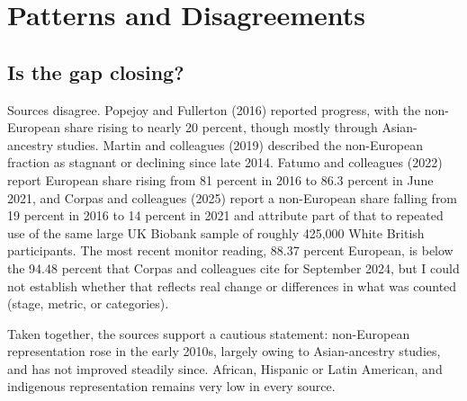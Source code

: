 \documentclass[12pt]{article}
\begin{document}
\begin{table}[H]
\centering\small
\caption{Quantified differences reported in three analyses of how ancestry imbalance relates to tool performance or study composition.}
\end{table}

\section*{Patterns and Disagreements}
\subsection*{Is the gap closing?}
Sources disagree. Popejoy and Fullerton (2016) reported progress, with the non-European share rising to nearly 20 percent, though mostly through Asian-ancestry studies. Martin and colleagues (2019) described the non-European fraction as stagnant or declining since late 2014. Fatumo and colleagues (2022) report European share rising from 81 percent in 2016 to 86.3 percent in June 2021, and Corpas and colleagues (2025) report a non-European share falling from 19 percent in 2016 to 14 percent in 2021 and attribute part of that to repeated use of the same large UK Biobank sample of roughly 425,000 White British participants. The most recent monitor reading, 88.37 percent European, is below the 94.48 percent that Corpas and colleagues cite for September 2024, but I could not establish whether that reflects real change or differences in what was counted (stage, metric, or categories).

Taken together, the sources support a cautious statement: non-European representation rose in the early 2010s, largely owing to Asian-ancestry studies, and has not improved steadily since. African, Hispanic or Latin American, and indigenous representation remains very low in every source.
\end{document}
